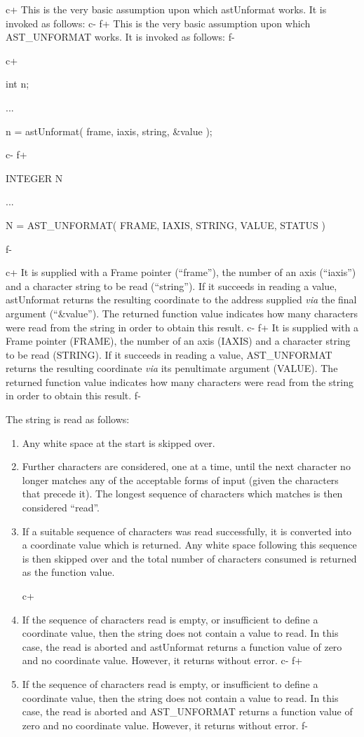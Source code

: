 \documentclass[twoside,11pt]{starlink}
\begin{document}
c+
This is the very basic assumption upon which astUnformat works. It is
invoked as follows:
c-
f+
This is the very basic assumption upon which AST\_UNFORMAT works. It is
invoked as follows:
f-

c+
\small
\begin{terminalv}
int n;

...

n = astUnformat( frame, iaxis, string, &value );
\end{terminalv}
\normalsize
c-
f+
\small
\begin{terminalv}
      INTEGER N

      ...

      N = AST_UNFORMAT( FRAME, IAXIS, STRING, VALUE, STATUS )
\end{terminalv}
\normalsize
f-

c+
It is supplied with a Frame pointer (``frame''), the number of an axis
(``iaxis'') and a character string to be read (``string''). If it
succeeds in reading a value, astUnformat returns the resulting
coordinate to the address supplied \emph{via} the final argument
(``\&value''). The returned function value indicates how many
characters were read from the string in order to obtain this result.
c-
f+
It is supplied with a Frame pointer (FRAME), the number of an axis
(IAXIS) and a character string to be read (STRING). If it succeeds in
reading a value, AST\_UNFORMAT returns the resulting coordinate
\emph{via} its penultimate argument (VALUE). The returned function
value indicates how many characters were read from the string in order
to obtain this result.
f-

The string is read as follows:

\begin{enumerate}
\item Any white space at the start is skipped over.

\item Further characters are considered, one at a time, until the next
character no longer matches any of the acceptable forms of input
(given the characters that precede it). The longest sequence of
characters which matches is then considered ``read''.

\item If a suitable sequence of characters was read successfully, it
is converted into a coordinate value which is returned. Any white
space following this sequence is then skipped over and the total
number of characters consumed is returned as the function value.

c+
\item If the sequence of characters read is empty, or insufficient to
define a coordinate value, then the string does not contain a value to
read. In this case, the read is aborted and astUnformat returns a
function value of zero and no coordinate value.  However, it returns
without error.
c-
f+
\item If the sequence of characters read is empty, or insufficient to
define a coordinate value, then the string does not contain a value to
read. In this case, the read is aborted and AST\_UNFORMAT returns a
function value of zero and no coordinate value. However, it returns
without error.
f-
\end{enumerate}
\end{document}
